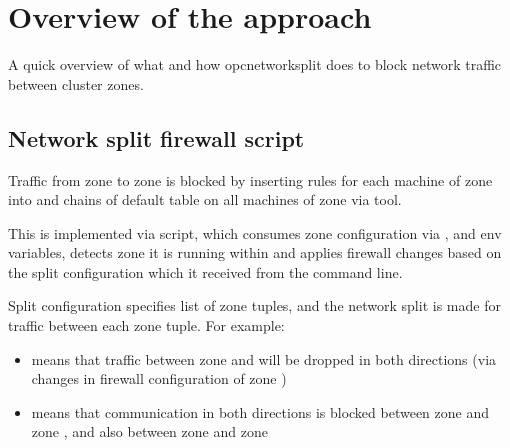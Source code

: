 \documentclass[letterpaper,10pt,english]{sphinxmanual}
\begin{document}
\chapter{Overview of the approach}
\label{\detokenize{overview:overview-of-the-approach}}\label{\detokenize{overview:overview}}\label{\detokenize{overview::doc}}
A quick overview of what and how opc\sphinxhyphen{}network\sphinxhyphen{}split does to block network
traffic between cluster zones.


\section{Network split firewall script}
\label{\detokenize{overview:network-split-firewall-script}}
Traffic from zone  to zone  is blocked by inserting  rules
for each machine of zone  into  and  chains of default
 table on all machines of zone  via  tool.

This is implemented via  script, which consumes zone
configuration via ,  and  env variables, detects
zone it is running within and applies firewall changes based on the split
configuration which it received from the command line.

Split configuration specifies list of zone tuples, and the network split is
made for traffic between each zone tuple. For example:
\begin{itemize}
\item {} 
 means that traffic between zone  and  will be dropped in
both directions (via changes in firewall configuration of zone )

\item {} 
 means that communication in both directions is blocked between
zone  and zone , and also between zone  and zone 

\end{itemize}
\end{document}
